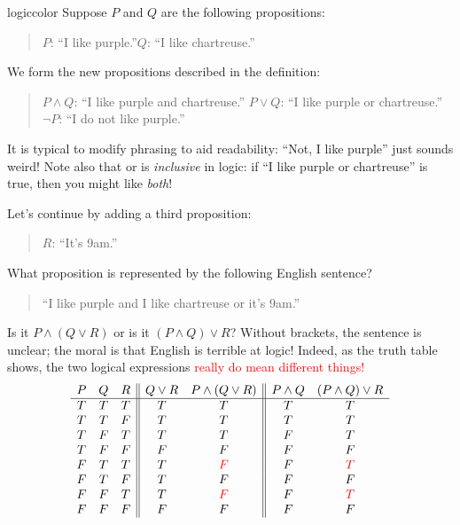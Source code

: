 \begin{example}{}{logiccolor}
	Suppose $P$ and $Q$ are the following propositions:
	\begin{quote}
		$P$: ``I like purple.''\qquad\qquad $Q$: ``I like chartreuse.''
	\end{quote}
	We form the new propositions described in the definition:
	\begin{quote}
		$P\wedge Q$: ``I like purple and chartreuse.''\qquad \qquad
		$P\vee Q$: ``I like purple or chartreuse.''\smallbreak
		$\neg P$: ``I do not like purple.''
	\end{quote}
	It is typical to modify phrasing to aid readability: ``Not, I like purple'' just sounds weird! Note also that or is \emph{inclusive} in logic: if ``I like purple or chartreuse'' is true, then you might like \emph{both}!\medbreak
	
	Let's continue by adding a third proposition:
	\begin{quote}
		$R$: ``It's 9am.''
	\end{quote}
	What proposition is represented by the following English sentence?
	\begin{quote}
		``I like purple and I like chartreuse or it's 9am.''
	\end{quote}
	Is it $P\wedge(Q\vee R)$ or is it $(P\wedge Q)\vee R$? Without brackets, the sentence is unclear; the moral is that English is terrible at logic! Indeed, as the truth table shows, the two logical expressions \textcolor{red}{really do mean different things!}\vspace{-1pt}
	 \[
	 \begin{array}{ccc||cc||cc}
			P & Q & R & Q\vee R & P\wedge (Q\vee R) & P\wedge Q & (P \wedge Q)\vee R\\\hline
			T & T & T & T & T & T & T\\
			T & T & F & T & T & T & T\\
			T & F & T & T & T & F & T\\
			T & F & F & F & F & F & F\\
			F & T & T & T & \textcolor{red}{F} & F & \textcolor{red}{T}\\
			F & T & F & T & F & F & F\\
			F & F & T & T & \textcolor{red}{F} & F & \textcolor{red}{T}\\
			F & F & F & F & F & F & F
		\end{array}
	 \]
\end{example}



